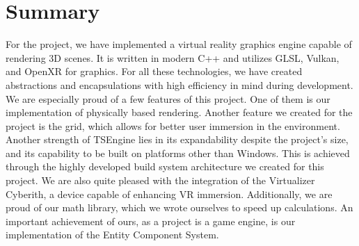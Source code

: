 \newpage
\section{Summary}
\label{sec:summary}
\hspace{\parindent}
For the project, we have implemented a virtual reality graphics engine capable of rendering 3D scenes. It is written in modern C++ and utilizes GLSL, Vulkan, and OpenXR for graphics. For all these technologies, we have created abstractions and encapsulations with high efficiency in mind during development. We are especially proud of a few features of this project. One of them is our implementation of physically based rendering. Another feature we created for the project is the grid, which allows for better user immersion in the environment. Another strength of TSEngine lies in its expandability despite the project's size, and its capability to be built on platforms other than Windows. This is achieved through the highly developed build system architecture we created for this project. We are also quite pleased with the integration of the Virtualizer Cyberith, a device capable of enhancing VR immersion. Additionally, we are proud of our math library, which we wrote ourselves to speed up calculations. An important achievement of ours, as a project is a game engine, is our implementation of the Entity Component System.